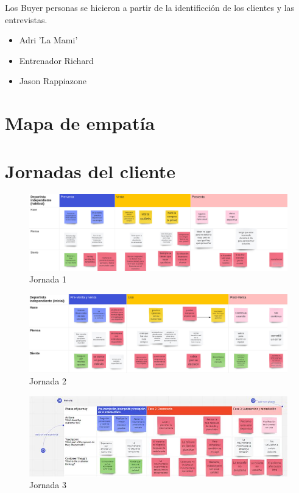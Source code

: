 \documentclass[11pt]{article}
\begin{document}
Los Buyer personas se hicieron a partir de la identificción de los
clientes y las entrevistas.

\begin{itemize}
\item Adri 'La Mami'
\item Entrenador Richard
\item Jason Rappiazone
\end{itemize}









\section{Mapa de empatía}
\label{sec:orgb86e1da}





\newpage


\section{Jornadas del cliente}
\label{sec:orge9f5666}

\begin{figure}[htbp]
\centering
\includegraphics[width=.9\linewidth]{./entrega_jornadas/deportista_independiente_habitual.jpg}
\caption{Jornada 1}
\end{figure}
\begin{figure}[htbp]
\centering
\includegraphics[width=.9\linewidth]{./entrega_jornadas/deportista_independiente_inicial.jpg}
\caption{Jornada 2}
\end{figure}
\begin{figure}[htbp]
\centering
\includegraphics[width=.9\linewidth]{./entrega_jornadas/padre_de_familia.jpg}
\caption{Jornada 3}
\end{figure}
\end{document}

